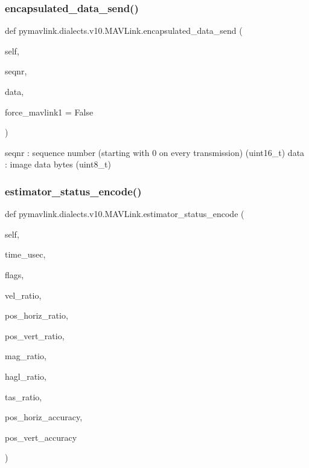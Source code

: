 \begin{DoxyVerb}
\begin{DoxyVerb}
\subsubsection{\texorpdfstring{encapsulated\+\_\+data\+\_\+send()}{encapsulated\_data\_send()}}
{\footnotesize\ttfamily def pymavlink.\+dialects.\+v10.\+M\+A\+V\+Link.\+encapsulated\+\_\+data\+\_\+send (\begin{DoxyParamCaption}\item[{}]{self,  }\item[{}]{seqnr,  }\item[{}]{data,  }\item[{}]{force\+\_\+mavlink1 = {\ttfamily False} }\end{DoxyParamCaption})}

\begin{DoxyVerb}seqnr                     : sequence number (starting with 0 on every transmission) (uint16_t)
data                      : image data bytes (uint8_t)\end{DoxyVerb}
 \mbox{\label{classpymavlink_1_1dialects_1_1v10_1_1MAVLink_a5303acc5733d8b2c37131c2fa76e0d72}} 
\subsubsection{\texorpdfstring{estimator\+\_\+status\+\_\+encode()}{estimator\_status\_encode()}}
{\footnotesize\ttfamily def pymavlink.\+dialects.\+v10.\+M\+A\+V\+Link.\+estimator\+\_\+status\+\_\+encode (\begin{DoxyParamCaption}\item[{}]{self,  }\item[{}]{time\+\_\+usec,  }\item[{}]{flags,  }\item[{}]{vel\+\_\+ratio,  }\item[{}]{pos\+\_\+horiz\+\_\+ratio,  }\item[{}]{pos\+\_\+vert\+\_\+ratio,  }\item[{}]{mag\+\_\+ratio,  }\item[{}]{hagl\+\_\+ratio,  }\item[{}]{tas\+\_\+ratio,  }\item[{}]{pos\+\_\+horiz\+\_\+accuracy,  }\item[{}]{pos\+\_\+vert\+\_\+accuracy }\end{DoxyParamCaption})}


\end{DoxyVerb}
\end{DoxyVerb}
